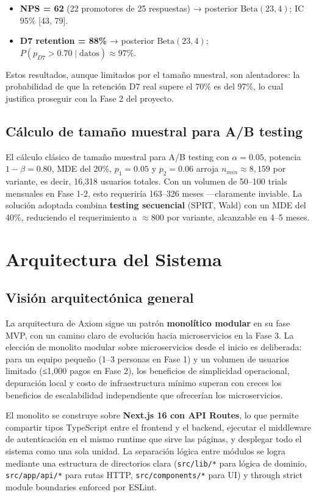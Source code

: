 \documentclass[10pt,a4paper,oneside]{report}
\begin{document}
\begin{itemize}[leftmargin=1.4em]
\item \textbf{NPS = 62} (22 promotores de 25 respuestas) → posterior $\text{Beta}(23, 4)$; IC 95\% [43, 79].
\item \textbf{D7 retention = 88\%} → posterior $\text{Beta}(23, 4)$; $P(p_{D7} > 0.70 \mid \text{datos}) \approx 97\%$.
\end{itemize}

Estos resultados, aunque limitados por el tamaño muestral, son alentadores: la probabilidad de que la retención D7 real supere el 70\% es del 97\%, lo cual justifica proseguir con la Fase 2 del proyecto.

\section{Cálculo de tamaño muestral para A/B testing}
El cálculo clásico de tamaño muestral para A/B testing con $\alpha = 0.05$, potencia $1 - \beta = 0.80$, MDE del 20\%, $p_1 = 0.05$ y $p_2 = 0.06$ arroja $n_{min} \approx 8{,}159$ por variante, es decir, 16,318 usuarios totales. Con un volumen de 50--100 trials mensuales en Fase 1-2, esto requeriría 163--326 meses —claramente inviable. La solución adoptada combina \textbf{testing secuencial} (SPRT, Wald) con un MDE del 40\%, reduciendo el requerimiento a $\approx 800$ por variante, alcanzable en 4--5 meses.

\chapter{Arquitectura del Sistema}

\section{Visión arquitectónica general}
La arquitectura de Axiom sigue un patrón \textbf{monolítico modular} en su fase MVP, con un camino claro de evolución hacia microservicios en la Fase 3. La elección de monolito modular sobre microservicios desde el inicio es deliberada: para un equipo pequeño (1--3 personas en Fase 1) y un volumen de usuarios limitado (≤1,000 pagos en Fase 2), los beneficios de simplicidad operacional, depuración local y costo de infraestructura mínimo superan con creces los beneficios de escalabilidad independiente que ofrecerían los microservicios.

El monolito se construye sobre \textbf{Next.js 16 con API Routes}, lo que permite compartir tipos TypeScript entre el frontend y el backend, ejecutar el middleware de autenticación en el mismo runtime que sirve las páginas, y desplegar todo el sistema como una sola unidad. La separación lógica entre módulos se logra mediante una estructura de directorios clara (\texttt{src/lib/*} para lógica de dominio, \texttt{src/app/api/*} para rutas HTTP, \texttt{src/components/*} para UI) y through strict module boundaries enforced por ESLint.
\end{document}
